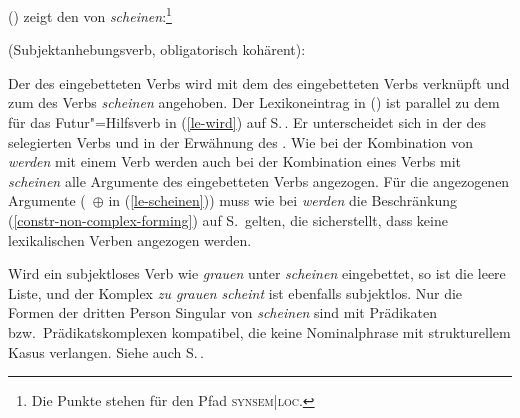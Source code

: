 {() zeigt den \locw von \emph{scheinen}:\footnote{%
Die Punkte stehen für den Pfad \textsc{synsem|loc}.
}

\eas
\label{le-scheinen}%
 (Subjektanhebungsverb, obligatorisch kohärent):\\
\zs

\noindent
Der \subjw des eingebetteten Verbs  wird mit dem \compsw des
eingebetteten Verbs  verknüpft und zum \argstw des Verbs \emph{scheinen} angehoben.
Der Lexikoneintrag in () ist parallel zu dem für das Futur"=Hilfsverb in (\ref{le-wird})
auf S.\,\pageref{le-wird}. Er unterscheidet sich in der \vform des selegierten Verbs und in der Erwähnung des \subjms.
Wie bei der Kombination von \emph{werden} mit einem Verb werden auch bei der Kombination
eines Verbs mit \emph{scheinen} alle Argumente des eingebetteten Verbs angezogen.
Für die angezogenen Argumente (\, $\oplus$  in (\ref{le-scheinen})) muss wie bei \emph{werden}
die Beschränkung (\ref{constr-non-complex-forming}) auf S.\,\pageref{constr-non-complex-forming} gelten,
die sicherstellt, dass keine lexikalischen Verben angezogen werden.

Wird ein subjektloses Verb wie \emph{grauen} unter \emph{scheinen} eingebettet, so
ist  die leere Liste, und der Komplex \emph{zu grauen scheint} ist ebenfalls
subjektlos. Nur die Formen der dritten Person Singular von \emph{scheinen}
sind mit Prädikaten bzw.\ Prädikatskomplexen kompatibel, 
die keine Nominalphrase mit strukturellem Kasus verlangen. Siehe auch S.\,\pageref{page-kongruenz-scheinen}.

}
